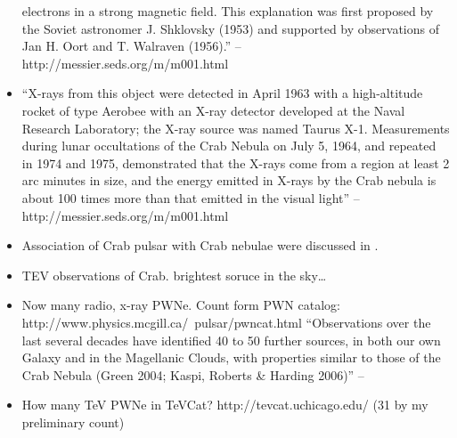 \begin{itemize}
      electrons in a strong magnetic field. This explanation was first
      proposed by the Soviet astronomer J. Shklovsky (1953) and supported
      by observations of Jan H. Oort and T. Walraven (1956).'' -- http://messier.seds.org/m/m001.html
  \item ``X-rays from this object were detected in April 1963 with a
      high-altitude rocket of type Aerobee with an X-ray detector developed
      at the Naval Research Laboratory; the X-ray source was named Taurus
      X-1. Measurements during lunar occultations of the Crab Nebula on
      July 5, 1964, and repeated in 1974 and 1975, demonstrated that the
      X-rays come from a region at least 2 arc minutes in size, and the
      energy emitted in X-rays by the Crab nebula is about 100 times more
      than that emitted in the visual light''
        -- http://messier.seds.org/m/m001.html
  \item Association of Crab pulsar with Crab nebulae were 
    discussed in \citep{staelin_1968_pulsating-radio}.
  \item TEV observations of Crab. brightest soruce in the sky\ldots
  \item Now many radio, x-ray PWNe. Count form PWN catalog: http://www.physics.mcgill.ca/~pulsar/pwncat.html
    ``Observations over the last several decades have identified 40 to 50
    further sources, in both our own Galaxy and in the Magellanic Clouds,
    with properties similar to those of the Crab Nebula (Green 2004;
    Kaspi, Roberts \& Harding 2006)'' -- \cite{gaensler_2006_evolution-structure}
  \item How many TeV PWNe in TeVCat? http://tevcat.uchicago.edu/ (31 by my preliminary count)
\end{itemize}




